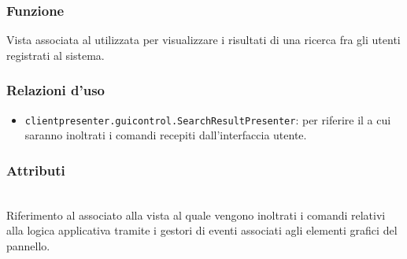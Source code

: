 \subsubsection*{Funzione}
Vista associata al   utilizzata per visualizzare i risultati di una ricerca fra gli utenti registrati al sistema.

\subsubsection*{Relazioni d'uso}
\begin{itemize}
  \item \texttt{clientpresenter.guicontrol.SearchResultPresenter}: per riferire il  a cui saranno inoltrati i comandi recepiti dall'interfaccia utente.
\end{itemize}

\subsubsection*{Attributi}
\begin{description}
  \item{}\\
  Riferimento al  associato alla vista al quale vengono inoltrati i comandi relativi alla logica applicativa tramite i gestori di eventi associati agli elementi grafici del pannello.
\end{description}

